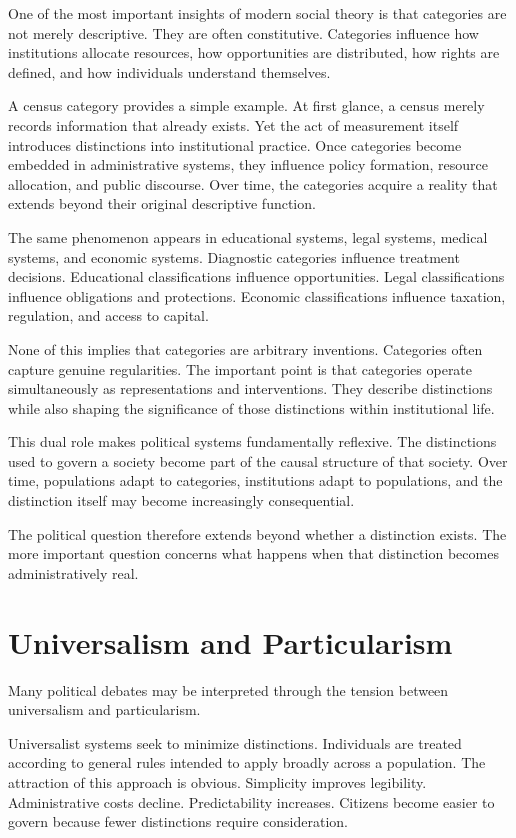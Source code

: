 \documentclass[11pt,oneside,openany]{book}
\begin{document}
One of the most important insights of modern social theory is that categories are not merely descriptive. They are often constitutive. Categories influence how institutions allocate resources, how opportunities are distributed, how rights are defined, and how individuals understand themselves.

A census category provides a simple example. At first glance, a census merely records information that already exists. Yet the act of measurement itself introduces distinctions into institutional practice. Once categories become embedded in administrative systems, they influence policy formation, resource allocation, and public discourse. Over time, the categories acquire a reality that extends beyond their original descriptive function.

The same phenomenon appears in educational systems, legal systems, medical systems, and economic systems. Diagnostic categories influence treatment decisions. Educational classifications influence opportunities. Legal classifications influence obligations and protections. Economic classifications influence taxation, regulation, and access to capital.

None of this implies that categories are arbitrary inventions. Categories often capture genuine regularities. The important point is that categories operate simultaneously as representations and interventions. They describe distinctions while also shaping the significance of those distinctions within institutional life.

This dual role makes political systems fundamentally reflexive. The distinctions used to govern a society become part of the causal structure of that society. Over time, populations adapt to categories, institutions adapt to populations, and the distinction itself may become increasingly consequential.

The political question therefore extends beyond whether a distinction exists. The more important question concerns what happens when that distinction becomes administratively real.

\section{Universalism and Particularism}

Many political debates may be interpreted through the tension between universalism and particularism.

Universalist systems seek to minimize distinctions. Individuals are treated according to general rules intended to apply broadly across a population. The attraction of this approach is obvious. Simplicity improves legibility. Administrative costs decline. Predictability increases. Citizens become easier to govern because fewer distinctions require consideration.
\end{document}
